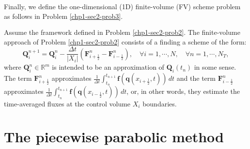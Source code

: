 Finally, we define the one-dimensional (1D) finite-volume (FV)
scheme problem as follows in Problem \ref{chp1-sec2-prob3}.
\begin{prob}[1D FV scheme]
	\label{chp1-sec2-prob3}
	Assume the framework defined in Problem \ref{chp1-sec2-prob2}.
	The finite-volume approach of Problem \ref{chp1-sec2-prob2}
	consists of a finding a scheme of the form:
        \begin{equation*}
		\mathbf{Q}_{i}^{n+1} =  \mathbf{Q}_{i}^{n} -
		\frac{\Delta t}{|X_i|} (\mathbf{F}_{i+\frac{1}{2}}^{n} - \mathbf{F}_{i-\frac{1}{2}}^{n}),
                \quad \forall i = 1, \cdots, N,
                \quad \forall n = 1, \cdots, N_T,
        \end{equation*}
	where $\mathbf{Q}_{i}^{n} \in \mathbb{R}^m$ is intended to be an approximation
	of $\mathbf{Q}_i(t_{n})$ in some sense.
	The term $\mathbf{F}_{i+\frac{1}{2}}^{n}$ approximates
	$\frac{1}{\Delta t}\int_{t_n}^{t_{n+1}} \mathbf{f}(\mathbf{q}(x_{i+\frac{1}{2}}, t)) \,dt $
	and the term
        $\mathbf{F}_{i-\frac{1}{2}}^{n}$ approximates
	$\frac{1}{\Delta t}\int_{t_n}^{t_{n+1}} \mathbf{f}(\mathbf{q}(x_{i-\frac{1}{2}}, t)) \,dt $,
	or, in other words, they estimate the time-averaged fluxes at the control volume $X_i$ boundaries.
\end{prob}
\section{The piecewise parabolic method}


